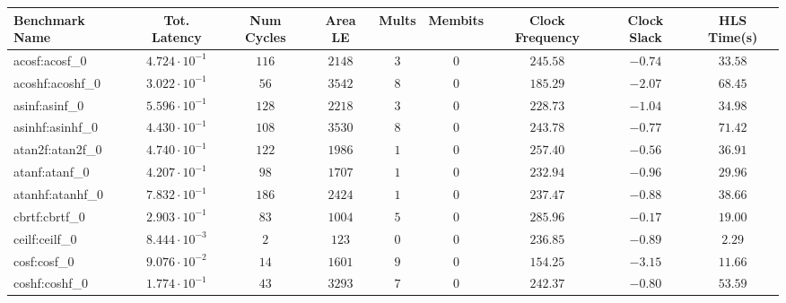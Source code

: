 \begin{tabular}{|l|c|c|c|c|c|c|c|c|}
\hline
Benchmark Name               & Tot. Latency            & Num Cycles & Area LE   & Mults   & Membits & Clock Frequency & Clock Slack & HLS Time(s) \\
\hline
acosf:acosf\_0               & $ 4.724 \cdot 10^{-1} $ & $ 116    $ & $ 2148  $ & $ 3   $ & $ 0   $ & $ 245.58      $ & $ -0.74   $ & $ 33.58   $ \\
acoshf:acoshf\_0             & $ 3.022 \cdot 10^{-1} $ & $ 56     $ & $ 3542  $ & $ 8   $ & $ 0   $ & $ 185.29      $ & $ -2.07   $ & $ 68.45   $ \\
asinf:asinf\_0               & $ 5.596 \cdot 10^{-1} $ & $ 128    $ & $ 2218  $ & $ 3   $ & $ 0   $ & $ 228.73      $ & $ -1.04   $ & $ 34.98   $ \\
asinhf:asinhf\_0             & $ 4.430 \cdot 10^{-1} $ & $ 108    $ & $ 3530  $ & $ 8   $ & $ 0   $ & $ 243.78      $ & $ -0.77   $ & $ 71.42   $ \\
atan2f:atan2f\_0             & $ 4.740 \cdot 10^{-1} $ & $ 122    $ & $ 1986  $ & $ 1   $ & $ 0   $ & $ 257.40      $ & $ -0.56   $ & $ 36.91   $ \\
atanf:atanf\_0               & $ 4.207 \cdot 10^{-1} $ & $ 98     $ & $ 1707  $ & $ 1   $ & $ 0   $ & $ 232.94      $ & $ -0.96   $ & $ 29.96   $ \\
atanhf:atanhf\_0             & $ 7.832 \cdot 10^{-1} $ & $ 186    $ & $ 2424  $ & $ 1   $ & $ 0   $ & $ 237.47      $ & $ -0.88   $ & $ 38.66   $ \\
cbrtf:cbrtf\_0               & $ 2.903 \cdot 10^{-1} $ & $ 83     $ & $ 1004  $ & $ 5   $ & $ 0   $ & $ 285.96      $ & $ -0.17   $ & $ 19.00   $ \\
ceilf:ceilf\_0               & $ 8.444 \cdot 10^{-3} $ & $ 2      $ & $ 123   $ & $ 0   $ & $ 0   $ & $ 236.85      $ & $ -0.89   $ & $ 2.29    $ \\
cosf:cosf\_0                 & $ 9.076 \cdot 10^{-2} $ & $ 14     $ & $ 1601  $ & $ 9   $ & $ 0   $ & $ 154.25      $ & $ -3.15   $ & $ 11.66   $ \\
coshf:coshf\_0               & $ 1.774 \cdot 10^{-1} $ & $ 43     $ & $ 3293  $ & $ 7   $ & $ 0   $ & $ 242.37      $ & $ -0.80   $ & $ 53.59   $ \\

\end{tabular}
